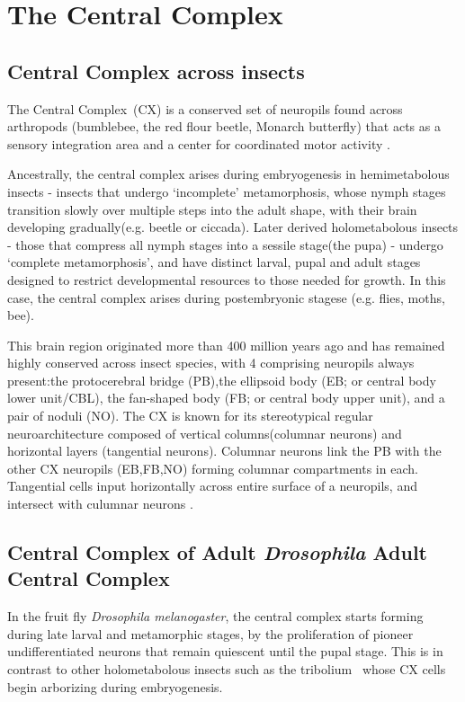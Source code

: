 \section{The Central Complex}

    \subsection{Central Complex across insects}
    
        The Central Complex~(CX) is a conserved set of neuropils found across arthropods (bumblebee, the red flour beetle, Monarch butterfly) that acts as a sensory integration area and a center for coordinated motor activity \citep{PfeifferHomberg2014, turnerevans2016CX, heinze2024variations}.

        Ancestrally, the central complex arises during embryogenesis in hemimetabolous insects - insects that undergo ‘incomplete’ metamorphosis, whose nymph stages transition slowly over multiple steps into the adult shape, with their brain developing gradually(e.g. beetle or ciccada).
        Later derived holometabolous insects - those that compress all nymph stages into a sessile stage(the pupa) -  undergo ‘complete metamorphosis’, and have distinct larval, pupal and adult stages designed to restrict developmental resources to those needed for growth. In this case, the central complex arises during  postembryonic stagese (e.g. flies, moths, bee).

        This brain region originated more than 400 million years ago and has remained highly conserved across insect species, with 4 comprising neuropils always present:the protocerebral bridge (PB),the ellipsoid body (EB; or central body lower unit/CBL), the fan-shaped body (FB; or central body upper unit), and a pair of noduli (NO). The CX is known for its stereotypical regular neuroarchitecture composed of vertical columns(columnar neurons) and horizontal layers (tangential neurons). Columnar neurons link the PB with the other CX neuropils (EB,FB,NO) forming columnar compartments in each. Tangential cells input horizontally across entire surface of a neuropils, and intersect with culumnar neurons \citep{honkanen2019insect}. 


    \subsection{Central Complex of Adult \textit{Drosophila} Adult Central Complex}
        In the fruit fly \textit{Drosophila melanogaster}, the central complex starts forming during late larval and metamorphic stages, by the proliferation of pioneer undifferentiated neurons that remain quiescent until the pupal stage. This is in contrast to other holometabolous insects such as the tribolium~\citep{farnworth2022atlas} whose CX cells begin arborizing during embryogenesis.

